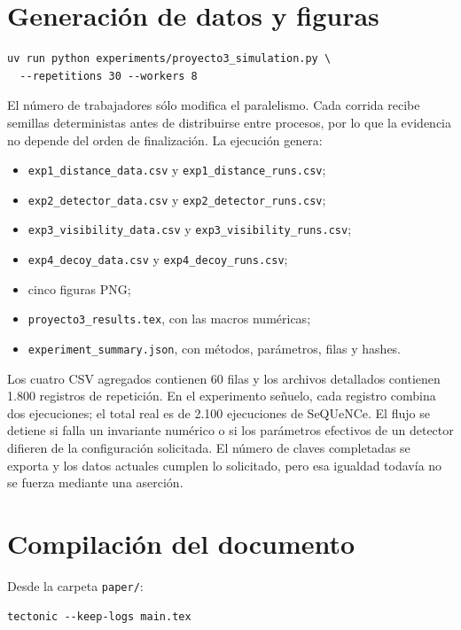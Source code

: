 \section{Generación de datos y figuras}

\begin{verbatim}
uv run python experiments/proyecto3_simulation.py \
  --repetitions 30 --workers 8
\end{verbatim}

El número de trabajadores sólo modifica el paralelismo. Cada corrida recibe semillas deterministas antes de distribuirse entre procesos, por lo que la evidencia no depende del orden de finalización. La ejecución genera:

\begin{itemize}
  \item \texttt{exp1\_distance\_data.csv} y \texttt{exp1\_distance\_runs.csv};
  \item \texttt{exp2\_detector\_data.csv} y \texttt{exp2\_detector\_runs.csv};
  \item \texttt{exp3\_visibility\_data.csv} y \texttt{exp3\_visibility\_runs.csv};
  \item \texttt{exp4\_decoy\_data.csv} y \texttt{exp4\_decoy\_runs.csv};
  \item cinco figuras PNG;
  \item \texttt{proyecto3\_results.tex}, con las macros numéricas;
  \item \texttt{experiment\_summary.json}, con métodos, parámetros, filas y hashes.
\end{itemize}

Los cuatro CSV agregados contienen 60 filas y los archivos detallados contienen 1.800 registros de repetición. En el experimento señuelo, cada registro combina dos ejecuciones; el total real es de 2.100 ejecuciones de SeQUeNCe. El flujo se detiene si falla un invariante numérico o si los parámetros efectivos de un detector difieren de la configuración solicitada. El número de claves completadas se exporta y los datos actuales cumplen lo solicitado, pero esa igualdad todavía no se fuerza mediante una aserción.

\section{Compilación del documento}

Desde la carpeta \texttt{paper/}:

\begin{verbatim}
tectonic --keep-logs main.tex
\end{verbatim}

